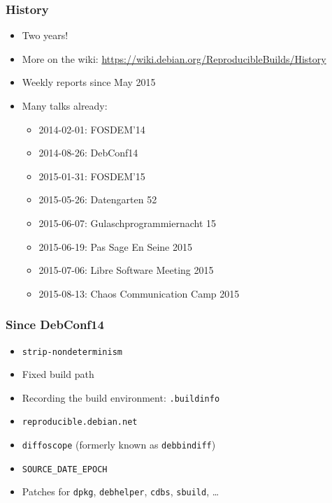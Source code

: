 \documentclass[14pt]{beamer}
\begin{document}
\begin{frame}
 \frametitle{History}

 \begin{itemize}
  \item Two years!
  \item More on the wiki:
    {\small \url{https://wiki.debian.org/ReproducibleBuilds/History}}
  \item Weekly reports since May 2015
  \item Many talks already:
   \begin{itemize}
    \item 2014-02-01: FOSDEM’14
    \item 2014-08-26: DebConf14
    \item 2015-01-31: FOSDEM’15
    \item 2015-05-26: Datengarten 52
    \item 2015-06-07: Gulaschprogrammiernacht 15
    \item 2015-06-19: Pas Sage En Seine 2015
    \item 2015-07-06: Libre Software Meeting 2015
    \item 2015-08-13: Chaos Communication Camp 2015
   \end{itemize}
 \end{itemize}
\end{frame}

\begin{frame}
 \frametitle{Since DebConf14}

 \begin{itemize}
  \item \texttt{strip-nondeterminism}
  \item Fixed build path
  \item Recording the build environment: \texttt{.buildinfo}
  \item \texttt{reproducible.debian.net}
  \item \texttt{diffoscope} (formerly known as \texttt{debbindiff})
  \item \texttt{SOURCE\_DATE\_EPOCH}
  \item Patches for \texttt{dpkg}, \texttt{debhelper}, \texttt{cdbs}, \texttt{sbuild}, …
 \end{itemize}
\end{frame}
\end{document}
